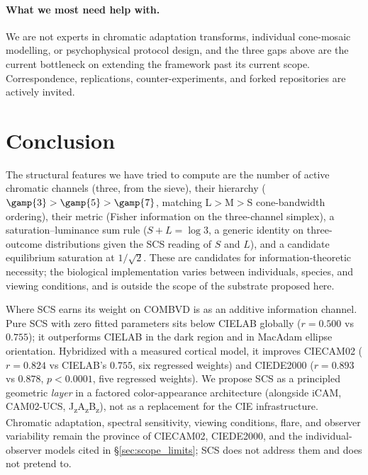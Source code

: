 \documentclass[12pt,a4paper]{article}
\begin{document}
\paragraph{What we most need help with.}
We are not experts in chromatic adaptation transforms, individual
cone-mosaic modelling, or psychophysical protocol design, and the
three gaps above are the current bottleneck on extending the
framework past its current scope. Correspondence, replications,
counter-experiments, and forked repositories are actively invited.

\section{Conclusion}
\label{sec:conclusion}

The structural features we have tried to compute are the number of
active chromatic channels (three, from the sieve), their hierarchy
($\gamp{3} > \gamp{5} > \gamp{7}$, matching L$>$M$>$S
cone-bandwidth ordering), their metric (Fisher information on the
three-channel simplex), a saturation--luminance sum rule
($S + L = \log 3$, a generic identity on three-outcome distributions
given the SCS reading of $S$ and $L$), and a candidate equilibrium
saturation at $1/\sqrt{2}$. These are candidates for
information-theoretic necessity; the biological implementation varies
between individuals, species, and viewing conditions, and is outside
the scope of the substrate proposed here.

Where SCS earns its weight on COMBVD is as an additive information
channel. Pure SCS with zero fitted parameters sits below CIELAB
globally ($r = 0.500$ vs $0.755$); it outperforms CIELAB in the dark
region and in MacAdam ellipse orientation. Hybridized with a measured
cortical model, it improves CIECAM02 ($r = 0.824$ vs CIELAB's
$0.755$, six regressed weights) and CIEDE2000 ($r = 0.893$ vs
$0.878$, $p < 0.0001$, five regressed weights). We propose SCS as a
principled geometric \emph{layer} in a factored color-appearance
architecture (alongside iCAM, CAM02-UCS, J\textsubscript{z}A\textsubscript{z}B\textsubscript{z}),
not as a replacement for the CIE infrastructure. Chromatic adaptation,
spectral sensitivity, viewing conditions, flare, and observer
variability remain the province of CIECAM02, CIEDE2000, and the
individual-observer models cited in \S\ref{sec:scope_limits}; SCS does
not address them and does not pretend to.
\end{document}
